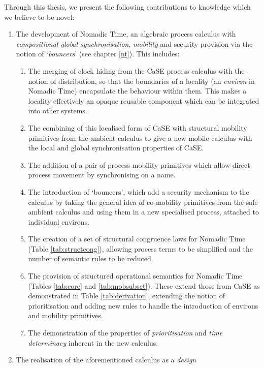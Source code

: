 Through this thesis, we present the following contributions to
knowledge which we believe to be novel:

\begin{enumerate}
\item The development of Nomadic Time, an algebraic process calculus
  with \emph{compositional global synchronisation}, \emph{mobility}
  and security provision via the notion of `\emph{bouncers}'
  (see chapter \ref{nt}).  This includes:
\begin{enumerate}[\bfseries {C1.}1]
\item The merging of clock hiding from the CaSE process calculus
  \cite{CaSE} with the notion of distribution, so that the boundaries
  of a locality (an \emph{environ} in Nomadic Time) encapsulate the
  behaviour within them.  This makes a locality effectively an opaque
  reusable component which can be integrated into other systems.
\item The combining of this localised form of CaSE with structural
  mobility primitives from the ambient calculus \cite{amb} to give a
  new mobile calculus with the local and global synchronisation
  properties of CaSE.
\item The addition of a pair of process mobility primitives which
  allow direct process movement by synchronising on a name.
\item The introduction of `bouncers', which add a security mechanism
  to the calculus by taking the general idea of co-mobility primitives
  from the safe ambient calculus \cite{sangiorgi:mobsafeambients} and
  using them in a new specialised process, attached to individual
  environs.
\item The creation of a set of structural congruence laws for Nomadic
  Time (Table \ref{tab:structcong}), allowing process terms to be
  simplified and the number of semantic rules to be reduced.
\item The provision of structured operational semantics for Nomadic
  Time (Tables \ref{tab:core} and \ref{tab:mobsubset}).  These extend
  those from CaSE as demonstrated in Table \ref{tab:derivation},
  extending the notion of prioritisation and adding new rules to handle
  the introduction of environs and mobility primitives.
\item The demonstration of the properties of \emph{prioritisation} and
  \emph{time determinacy} inherent in the new calculus.
\end{enumerate}
\item The realisation of the aforementioned calculus as a \emph{design
}
\end{enumerate}
